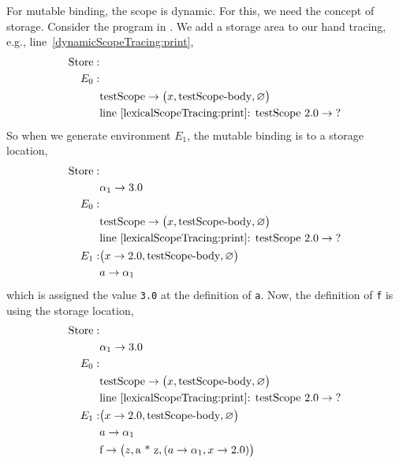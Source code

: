 \documentclass[fsharpnotes.tex]{subfiles}
\begin{document}
For mutable binding, the scope is dynamic. For this, we need the concept of storage. Consider the program in .
%
%
We add a storage area to our hand tracing, e.g., line~\ref{dynamicScopeTracing:print},
\begin{align*}
  \text{Store}: &\\
  E_0:&\\
      &\text{testScope} \rightarrow \big(x, \text{testScope-body}, \varnothing\big)\\
      & \text{line~\ref{lexicalScopeTracing:print}: testScope 2.0} \rightarrow \text{?}\\
\end{align*}
So when we generate environment $E_1$, the mutable binding is to a storage location,
\begin{align*}
  \text{Store}: &\\
  & \alpha_1 \rightarrow 3.0\\
  E_0:&\\
      &\text{testScope} \rightarrow \big(x, \text{testScope-body}, \varnothing\big)\\
      & \text{line~\ref{lexicalScopeTracing:print}: testScope 2.0} \rightarrow \text{?}\\
  E_1: & \big(x\rightarrow 2.0, \text{testScope-body}, \varnothing\big)\\
      & a \rightarrow \alpha_1\\
\end{align*}
which is assigned the value \lstinline!3.0! at the definition of \lstinline!a!. Now, the definition of \lstinline!f! is using the storage location,
\begin{align*}
  \text{Store}: &\\
  & \alpha_1 \rightarrow 3.0\\
  E_0:&\\
      &\text{testScope} \rightarrow \big(x, \text{testScope-body}, \varnothing\big)\\
      & \text{line~\ref{lexicalScopeTracing:print}: testScope 2.0} \rightarrow \text{?}\\
  E_1: & \big(x\rightarrow 2.0, \text{testScope-body}, \varnothing\big)\\
      & a \rightarrow \alpha_1\\
      & \text{f} \rightarrow \big(z, \text{a * z}, (a \rightarrow \alpha_1, x\rightarrow 2.0)\big)\\
\end{align*}
\end{document}
